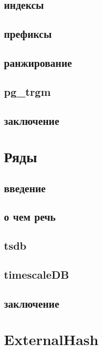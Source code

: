 \documentclass[aspectratio=169]{beamer}
\begin{document}
      \subsection{индексы}
        
      \subsection{префиксы}
        
        
      \subsection{ранжирование}
        
      \subsection{pg\_trgm}
        
      \subsection{заключение}
        
    \section{Ряды}
      \subsection{введение}
        
      \subsection{о чем речь}
        
      \subsection{tsdb}
        
      \subsection{timescaleDB}
        
      \subsection{заключение}
        
    \section{ExternalHash}
\end{document}
